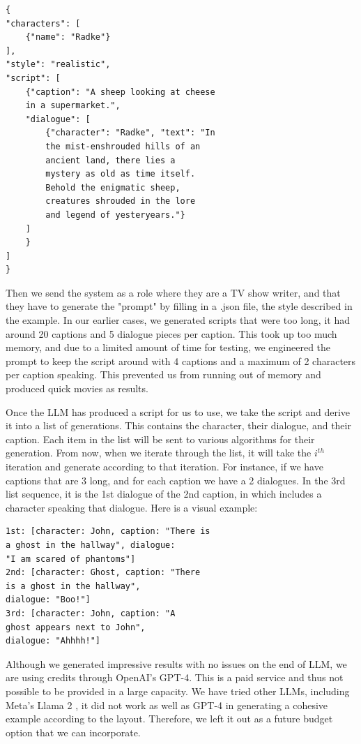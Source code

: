 \documentclass[conference]{IEEEtran}
\begin{document}
\begin{verbatim}
{
"characters": [
    {"name": "Radke"}
],
"style": "realistic",
"script": [ 
    {"caption": "A sheep looking at cheese 
    in a supermarket.", 
    "dialogue": [
        {"character": "Radke", "text": "In 
        the mist-enshrouded hills of an 
        ancient land, there lies a 
        mystery as old as time itself. 
        Behold the enigmatic sheep, 
        creatures shrouded in the lore 
        and legend of yesteryears."}
    ]
    }
]
}
\end{verbatim}

Then we send the system as a role where they are a TV show writer, and that they have to generate the "prompt" by filling in a .json file, the style described in the example. In our earlier cases, we generated scripts that were too long, it had around 20 captions and 5 dialogue pieces per caption. This took up too much memory, and due to a limited amount of time for testing, we engineered the prompt to keep the script around with 4 captions and a maximum of 2 characters per caption speaking. This prevented us from running out of memory and produced quick movies as results. 

Once the LLM has produced a script for us to use, we take the script and derive it into a list of generations. This contains the character, their dialogue, and their caption. Each item in the list will be sent to various algorithms for their generation. From now, when we iterate through the list, it will take the $i^{th}$ iteration and generate according to that iteration. For instance, if we have captions that are 3 long, and for each caption we have a 2 dialogues. In the 3rd list sequence, it is the 1st dialogue of the 2nd caption, in which includes a character speaking that dialogue. Here is a visual example:

\begin{verbatim}
1st: [character: John, caption: "There is 
a ghost in the hallway", dialogue: 
"I am scared of phantoms"]
2nd: [character: Ghost, caption: "There 
is a ghost in the hallway", 
dialogue: "Boo!"]
3rd: [character: John, caption: "A 
ghost appears next to John", 
dialogue: "Ahhhh!"]
\end{verbatim}

Although we generated impressive results with no issues on the end of LLM, we are using credits through OpenAI's GPT-4. This is a paid service and thus not possible to be provided in a large capacity. We have tried other LLMs, including Meta's Llama 2 \cite{llama2}, it did not work as well as GPT-4 in generating a cohesive example according to the layout. Therefore, we left it out as a future budget option that we can incorporate.
\end{document}
